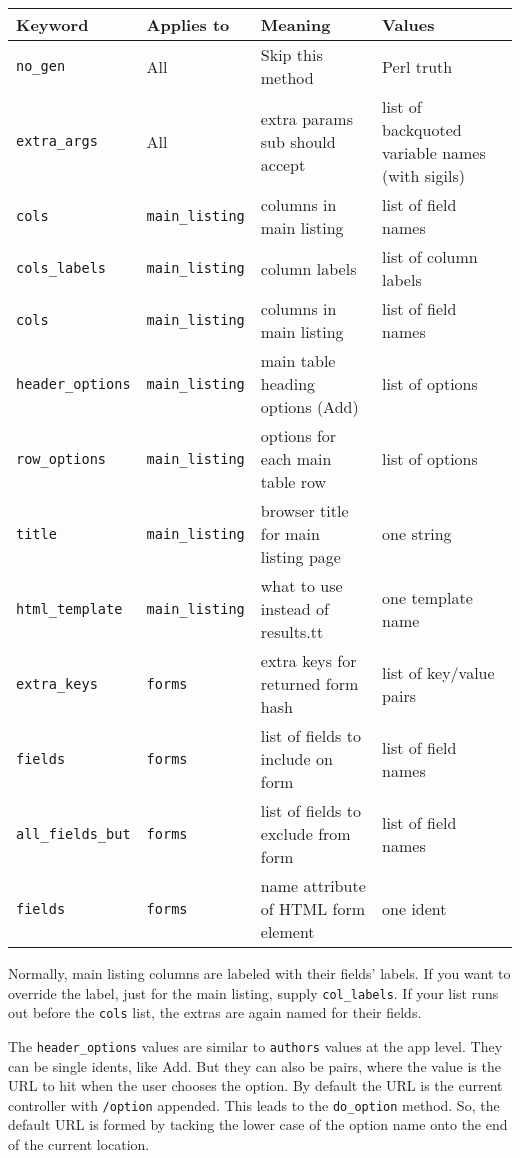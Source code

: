 \begin{tabular}{l|l|l|l}
Keyword & Applies to & Meaning & Values \\
\hline
\verb+no_gen+ & All & Skip this method & Perl truth \\
\verb+extra_args+ & All & extra params sub should accept
              & list of backquoted variable names (with sigils) \\
\verb+cols+   & \verb+main_listing+ & columns in main listing
              & list of field names \\
\verb+cols_labels+ & \verb+main_listing+ & column labels
              & list of column labels \\
\verb+cols+   & \verb+main_listing+ & columns in main listing
              & list of field names \\
\verb+header_options+ & \verb+main_listing+ & main table heading options (Add)
              & list of options \\
\verb+row_options+ & \verb+main_listing+ & options for each main table row
              & list of options \\
\verb+title+ & \verb+main_listing+ & browser title for main listing page
              & one string \\
\verb+html_template+ & \verb+main_listing+ & what to use instead of results.tt
              & one template name \\
\verb+extra_keys+ & \verb+forms+ & extra keys for returned form hash
              & list of key/value pairs \\
\verb+fields+ & \verb+forms+ & list of fields to include on form
              & list of field names \\
\verb+all_fields_but+ & \verb+forms+ & list of fields to exclude from form
              & list of field names \\
\verb+fields+ & \verb+forms+ & name attribute of HTML form element
              & one ident \\
\end{tabular}

Normally, main listing columns are labeled with their fields' labels.
If you want to override the label, just for the main listing, supply
\verb+col_labels+.  If your list runs out before the \verb+cols+ list,
the extras are again named for their fields.

The \verb+header_options+ values are similar to \verb+authors+ values
at the app level.  They can be single idents, like Add.  But they can
also be pairs, where the value is the URL to hit when the user chooses
the option.  By default the URL is the current controller with
\verb+/option+ appended.  This leads to the \verb+do_option+ method.
So, the default URL is formed by tacking the lower case of the option name
onto the end of the current location.

